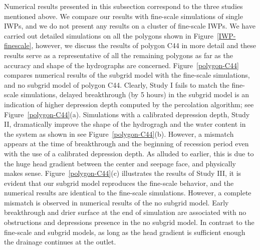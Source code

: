 \documentclass[review,11pt]{elsarticle}
\begin{document}
Numerical results presented in this subsection correspond to the three studies mentioned above. We compare our results with fine-scale simulations of single IWPs, and we do not present any results on a cluster of fine-scale IWPs. We have carried out detailed simulations on all the polygons shown in Figure~\ref{IWP-finescale}, however, we discuss the results of polygon C44 in more detail and these results serve as a representative of all the remaining polygons as far as the accuracy and shape of the hydrographs are concerned. Figure~\ref{polygon-C44} compares numerical results of the subgrid model with the fine-scale simulations, and no subgrid model of polygon C44. Clearly, Study I fails to match the fine-scale simulations, delayed breakthrough (by 5 hours) in the subgrid model is an indication of higher depression depth computed by the percolation algorithm; see Figure~\ref{polygon-C44}(a). Simulations with a calibrated depression depth, Study II, dramatically improve the shape of the hydrogragh and the water content in the system as shown in see Figure~\ref{polygon-C44}(b). However, a mismatch appears at the time of breakthrough and the beginning of recession period even with the use of a calibrated depression depth. As alluded to earlier, this is due to the huge head gradient between the center and seepage face, and physically makes sense. Figure~\ref{polygon-C44}(c) illustrates the results of Study III, it is evident that our subgrid model reproduces the fine-scale behavior, and the numerical results are identical to the fine-scale simulations. However, a complete mismatch is observed in numerical results of the no subgrid model. Early breakthrough and drier surface at the end of simulation are associated with no obstructions and depressions presence in the no subgrid model. In contrast to the fine-scale and subgrid models, as long as the head gradient is sufficient enough the drainage continues at the outlet.
\end{document}
